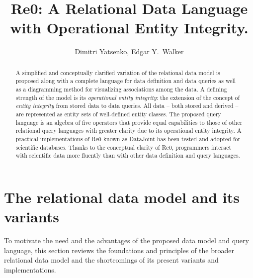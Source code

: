 \documentclass[letter,twocolumn,10pt]{article}
\title{Re0: A Relational Data Language with Operational Entity Integrity.}
\author{Dimitri Yatsenko, Edgar Y.\ Walker}
\begin{document}
\maketitle
\begin{abstract}
A simplified and conceptually clarified variation of the relational data model is proposed along with a complete language for data definition and data queries as well as a diagramming method for visualizing associations among the data.  
A defining strength of the model is its \emph{operational entity integrity}: the extension of the concept of \emph{entity integrity} from stored data to data queries. 
All data -- both stored and derived -- are represented as entity sets of well-defined entity classes.  
The proposed query language is an algebra of five operators that provide equal capabilities to those of other relational query languages with greater clarity due to its operational entity integrity. 
A practical implementations of Re0 known as DataJoint has been tested and adopted for scientific databases.  
Thanks to the conceptual clarity of Re0, programmers interact with scientific data more fluently than with other data definition and query languages.

\end{abstract}

\section{The relational data model and its variants}
To motivate the need and the advantages of the proposed data model and query language, this section reviews the foundations and principles of the broader relational data model and the shortcomings of its present variants and implementations. 
\end{document}

